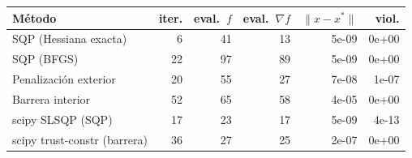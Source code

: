 \begin{tabular}{lrrrrr}\toprule
M\'etodo & iter. & eval.\ $f$ & eval.\ $\nabla f$ & $\|x-x^\ast\|$ & viol.\\\midrule
SQP (Hessiana exacta) & 6 & 41 & 13 & 5e-09 & 0e+00\\
SQP (BFGS) & 22 & 97 & 89 & 5e-09 & 0e+00\\
Penalización exterior & 20 & 55 & 27 & 7e-08 & 1e-07\\
Barrera interior & 52 & 65 & 58 & 4e-05 & 0e+00\\
scipy SLSQP (SQP) & 17 & 23 & 17 & 5e-09 & 4e-13\\
scipy trust-constr (barrera) & 36 & 27 & 25 & 2e-07 & 0e+00\\
\bottomrule\end{tabular}
